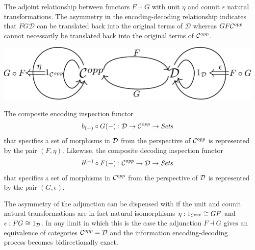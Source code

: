 \begin{frame}
The adjoint relationship between functors $F \dashv G$ with unit $\eta$ and counit $\epsilon$ natural transformations. The asymmetry in the encoding-decoding relationship indicates that $FG \mathcal{D}$ can be translated back into the original terms of $\mathcal{D}$ whereas $GF {\mathcal C}^{opp}$ cannot necessarily be translated back into the original terms of ${\mathcal C}^{opp}$.
\begin{center}
\includegraphics[width=0.9\framewidth]{fig/adjunction.pdf}
\end{center}
\end{frame}

\begin{frame}
The composite encoding inspection functor 
$$
b_{(-)} \circ G(-): \mathcal{D} \rightarrow {\mathcal C}^{opp} \rightarrow \textit{Sets}
$$
that specifies a set of morphisms in ${\mathcal D}$ from the perspective of ${\mathcal C}^{opp}$ is represented by the pair $(F,\eta)$. Likewise, the composite decoding inspection functor 
$$
b^{(-)} \circ F(-): {\mathcal C}^{opp} \rightarrow {\mathcal D} \rightarrow \textit{Sets}
$$
that specifies a set of morphisms in ${\mathcal C}^{opp}$ from the perspective of ${\mathcal D}$ is represented by the pair $(G,\epsilon)$.
\end{frame}

\begin{frame}
The asymmetry of the adjunction can be dispensed with if the unit and counit natural transformations are in fact natural isomorphisms $\eta: 1_{{\mathcal C}^{opp}} \cong GF$ and $\epsilon: FG \cong 1_{{\mathcal D}}$. In any limit in which this is the case the adjunction $F \dashv G$ gives an equivalence of categories ${\mathcal C}^{opp} = {\mathcal D}$ and the information encoding-decoding process becomes bidirectionally exact.
\end{frame}
